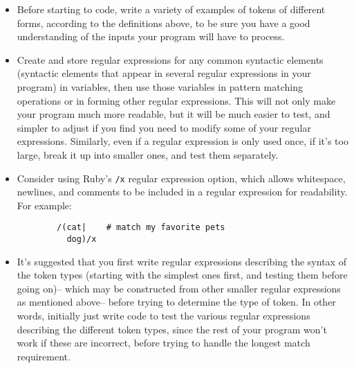 \documentclass[11pt]{article}
\begin{document}
    \begin{itemize}

      \addtolength{\itemsep}{-1mm}

      \item Before starting to code, write a variety of examples of 
            tokens of different forms, according to the definitions above,
            to be sure you have a good understanding of the inputs your
            program will have to process.

      \item Create and store regular expressions for any common syntactic
            elements (syntactic elements that appear in several regular
            expressions in your program) in variables, then use those
            variables in pattern matching operations or in forming other
            regular expressions.  This will not only make your program much
            more readable, but it will be much easier to test, and simpler
            to adjust if you find you need to modify some of your regular
            expressions.  Similarly, even if a regular expression is only
            used once, if it's too large, break it up into smaller ones, and
            test them separately.

      \item Consider using Ruby's \texttt{/x} regular expression option,
            which allows whitespace, newlines, and comments to be included
            in a regular expression for readability.  For example:

            \smallskip

            \begin{centering}

              \begin{BVerbatim}
        /(cat|    # match my favorite pets
          dog)/x
              \end{BVerbatim}

            \end{centering}

            \smallskip

      \item It's suggested that you first write regular expressions
            describing the syntax of the token types (starting with the
            simplest ones first, and testing them before going on)-- which
            may be constructed from other smaller regular expressions as
            mentioned above-- before trying to determine the type of token.
            In other words, initially just write code to test the various
            regular expressions describing the different token types, since
            the rest of your program won't work if these are incorrect,
            before trying to handle the longest match requirement.


\end{itemize}
\end{document}
